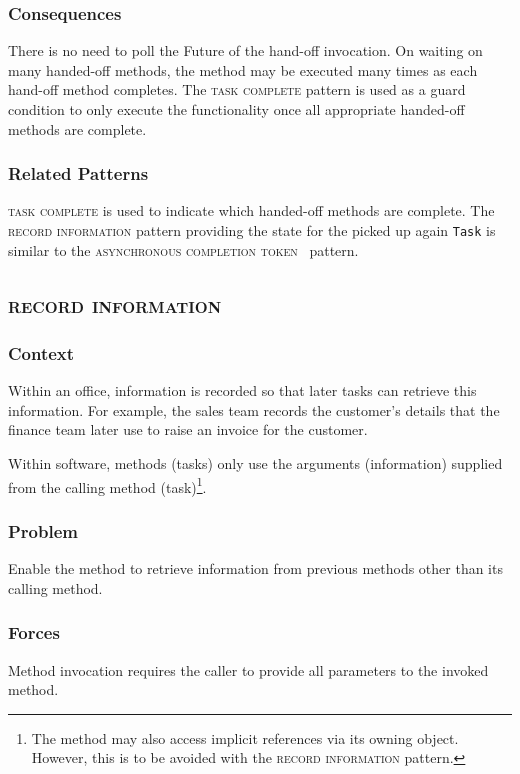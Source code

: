 \documentclass[prodmode]{style/acmlarge}
\begin{document}
\subsubsection*{Consequences} There is no need to poll the Future of the
hand-off invocation.  On waiting on many handed-off methods, the method may be
executed many times as each hand-off method completes.  The \textsc{task
complete} pattern is used as a guard condition to only execute the functionality
once all appropriate handed-off methods are complete.

\subsubsection*{Related Patterns} \textsc{task complete} is used to indicate
which handed-off methods are complete.  The \textsc{record information} pattern
providing the state for the picked up again \texttt{Task} is similar to the
\textsc{asynchronous completion token}~\cite{posa} pattern.



\subsection{\textsc{\textbf{record information}}}

\subsubsection*{Context} Within an office, information is recorded so that later
tasks can retrieve this information.  For example, the sales team records the
customer's details that the finance team later use to raise an invoice for the
customer.

Within software, methods (tasks) only use the arguments (information) supplied
from the calling method (task)\footnote{The method may also access implicit
references via its owning object.  However, this is to be avoided with the
\textsc{record information} pattern.}.

\subsubsection*{\textbf{Problem}} Enable the method to retrieve information from previous
methods other than its calling method.

\subsubsection*{Forces} Method invocation requires the caller to provide all
parameters to the invoked method.
\end{document}
